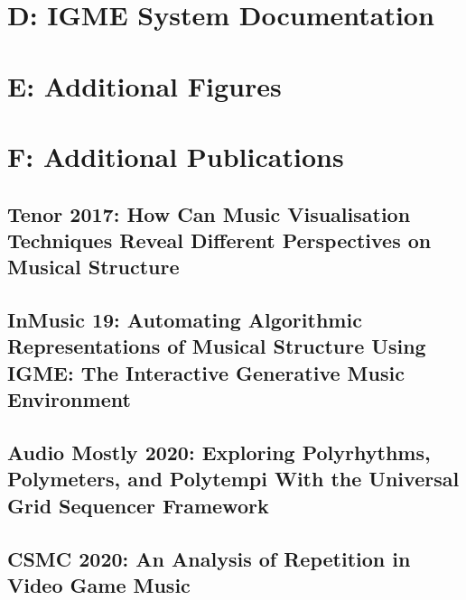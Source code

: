 \chapter{D: IGME System Documentation}
\label{app:igme}


\chapter{E: Additional Figures}
\label{app:extrafig}

%
\chapter{F: Additional Publications}
\label{app:conference}

\section{Tenor 2017: How Can Music Visualisation Techniques Reveal Different Perspectives on Musical Structure}
%


\section{InMusic 19: Automating Algorithmic Representations of Musical Structure Using IGME: The Interactive Generative Music Environment}

%

\section{Audio Mostly 2020: Exploring Polyrhythms, Polymeters, and Polytempi With the Universal Grid Sequencer Framework}

%

\section{CSMC 2020: An Analysis of Repetition in Video Game Music}
%


